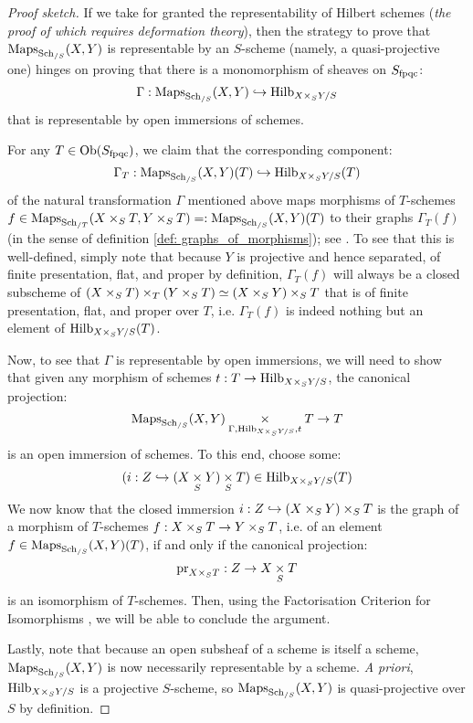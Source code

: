             \begin{proof}[Proof sketch]
                If we take for granted the representability of Hilbert schemes (\textit{the proof of which requires deformation theory}), then the strategy to prove that $\mathrm{Maps}_{\mathrm{Sch}_{/S}}(X, Y)$ is representable by an $S$-scheme (namely, a quasi-projective one) hinges on proving that there is a monomorphism of sheaves on $S_{\mathrm{fpqc}}$:
                    $$\Gamma: \Maps_{\Sch_{/S}}(X, Y) \hookrightarrow \Hilb_{X \x_S Y/S}$$
                that is representable by open immersions of schemes.

                For any $T \in \mathrm{Ob}(S_{\mathrm{fpqc}})$, we claim that the corresponding component:
                    $$\Gamma_T: \Maps_{\Sch_{/S}}(X, Y)(T) \hookrightarrow \Hilb_{X \x_S Y/S}(T)$$
                of the natural transformation $\Gamma$ mentioned above maps morphisms of $T$-schemes $f \in \Maps_{\Sch_{/T}}(X \x_S T, Y \x_S T) =: \Maps_{\Sch_{/S}}(X, Y)(T)$ to their graphs $\Gamma_T(f)$ (in the sense of definition \ref{def: graphs_of_morphisms}); see \cite[\href{https://stacks.math.columbia.edu/tag/0D1A}{Tag 0D1A}]{stacks}. To see that this is well-defined, simply note that because $Y$ is projective and hence separated, of finite presentation, flat, and proper by definition, $\Gamma_T(f)$ will always be a closed subscheme of $(X \x_S T) \x_T (Y \x_S T) \cong (X \x_S Y) \x_S T$ that is of finite presentation, flat, and proper over $T$, i.e. $\Gamma_T(f)$ is indeed nothing but an element of $\Hilb_{X \x_S Y/S}(T)$.

                Now, to see that $\Gamma$ is representable by open immersions, we will need to show that given any morphism of schemes $t: T \to \Hilb_{X \x_S Y/S}$, the canonical projection:
                    $$\Maps_{\Sch_{/S}}(X, Y) \x_{ \Gamma, \Hilb_{X \x_S Y/S}, t } T \to T$$
                is an open immersion of schemes. To this end, choose some:
                    $$(i: Z \hookrightarrow (X \x_S Y) \x_S T) \in \Hilb_{X \x_S Y/S}(T)$$
                We now know that the closed immersion $i: Z \hookrightarrow (X \x_S Y) \x_S T$ is the graph of a morphism of $T$-schemes $f: X \x_S T \to Y \x_S T$, i.e. of an element $f \in \mathrm{Maps}_{\mathrm{Sch}_{/S}}(X, Y)(T)$, if and only if the canonical projection:
                    $$\pr_{X \x_S T}: Z \to X \x_S T$$
                is an isomorphism of $T$-schemes. Then, using the Factorisation Criterion for Isomorphisms \cite[\href{https://stacks.math.columbia.edu/tag/05XD}{Tag 05XD}]{stacks}, we will be able to conclude the argument.  

                Lastly, note that because an open subsheaf of a scheme is itself a scheme, $\mathrm{Maps}_{\mathrm{Sch}_{/S}}(X, Y)$ is now necessarily representable by a scheme. \textit{A priori}, $\Hilb_{X \x_S Y/S}$ is a projective $S$-scheme, so $\mathrm{Maps}_{\mathrm{Sch}_{/S}}(X, Y)$ is quasi-projective over $S$ by definition.
            \end{proof}
